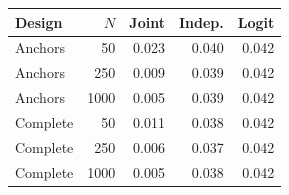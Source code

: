 \begin{tabular}{lrrrr}
\toprule
Design & $N$ & Joint & Indep. & Logit \\
\midrule
Anchors & 50 & 0.023 & 0.040 & 0.042 \\
Anchors & 250 & 0.009 & 0.039 & 0.042 \\
Anchors & 1000 & 0.005 & 0.039 & 0.042 \\
Complete & 50 & 0.011 & 0.038 & 0.042 \\
Complete & 250 & 0.006 & 0.037 & 0.042 \\
Complete & 1000 & 0.005 & 0.038 & 0.042 \\
\bottomrule
\end{tabular}
